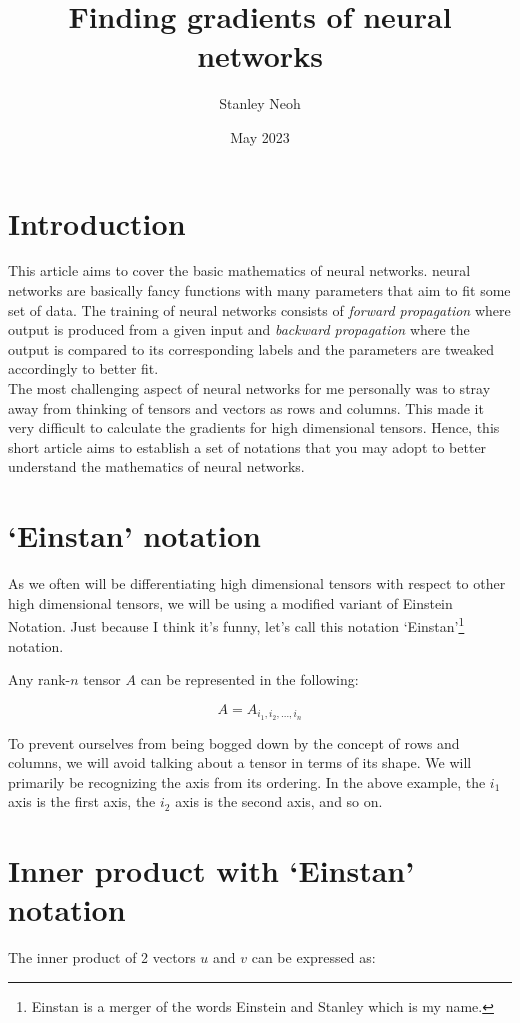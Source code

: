 \documentclass{article}
\title{Finding gradients of neural networks}
\author{Stanley Neoh}
\date{May 2023}
\begin{document}
\maketitle

\section{Introduction}
This article aims to cover the basic mathematics of neural networks. neural networks are basically fancy functions with many parameters that aim to fit some set of data. The training of neural networks consists of \emph{forward propagation} where output is produced from a given input and \emph{backward propagation} where the output is compared to its corresponding labels and the parameters are tweaked accordingly to better fit.\\ 

The most challenging aspect of neural networks for me personally was to stray away from thinking of tensors and vectors as rows and columns. This made it very difficult to calculate the gradients for high dimensional tensors. Hence, this short article aims to establish a set of notations that you may adopt to better understand the mathematics of neural networks.

\section{`Einstan' notation}
As we often will be differentiating high dimensional tensors with respect to other high dimensional tensors, we will be using a modified variant of Einstein Notation. Just because I think it's funny, let's call this notation `Einstan'\footnote{Einstan is a merger of the words Einstein and Stanley which is my name.} notation.

Any rank-\(n\) tensor \(A\) can be represented in the following:

\[A = A_{i_1, i_2, \dots, i_n}\]

To prevent ourselves from being bogged down by the concept of rows and columns, we will avoid talking about a tensor in terms of its shape. We will primarily be recognizing the axis from its ordering. In the above example, the $i_1$ axis is the first axis, the $i_2$ axis is the second axis, and so on.

\section{Inner product with `Einstan' notation}
The inner product of 2 vectors \(u\) and \(v\) can be expressed as:
\end{document}
